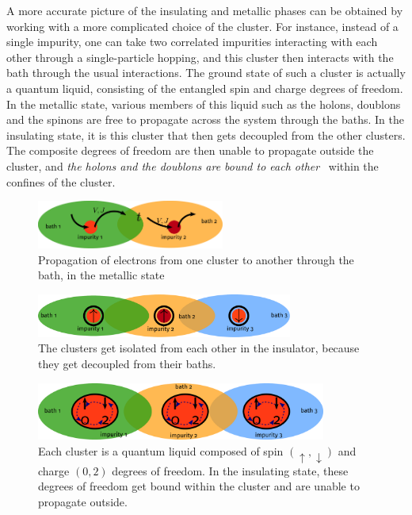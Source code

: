 \documentclass{report}
\numberwithin{equation}{section}
\begin{document}
A more accurate picture of the insulating and metallic phases can be obtained by working with a more complicated choice of the cluster. For instance, instead of a single impurity, one can take two correlated impurities interacting with each other through a single-particle hopping, and this cluster then interacts with the bath through the usual interactions. The ground state of such a cluster is actually a quantum liquid, consisting of the entangled spin and charge degrees of freedom. In the metallic state, various members of this liquid such as the holons, doublons and the spinons are free to propagate across the system through the baths. In the insulating state, it is this cluster that then gets decoupled from the other clusters. The composite degrees of freedom are then unable to propagate outside the cluster, and \textit{the holons and the doublons are bound to each other}~\cite{Mott_1949} within the confines of the cluster.

\begin{figure}[ht]
	\centering
	\includegraphics[width=0.55\textwidth]{../figures/metal_prop.pdf}
	\caption{Propagation of electrons from one cluster to another through the bath, in the metallic state}
\end{figure}

\begin{figure}[!ht]
	\centering
	\includegraphics[width=0.75\textwidth]{../figures/ins_prop.pdf}
	\caption{The clusters get isolated from each other in the insulator, because they get decoupled from their baths.}
\end{figure}

\begin{figure}[!ht]
	\centering
	\includegraphics[width=0.85\textwidth]{../figures/ins_prop_cluster.pdf}
	\caption{Each cluster is a quantum liquid composed of spin \(\left(\uparrow,\downarrow\right) \) and charge \(\left(0,2\right) \) degrees of freedom. In the insulating state, these degrees of freedom get bound within the cluster and are unable to propagate outside.}
\end{figure}
\end{document}
